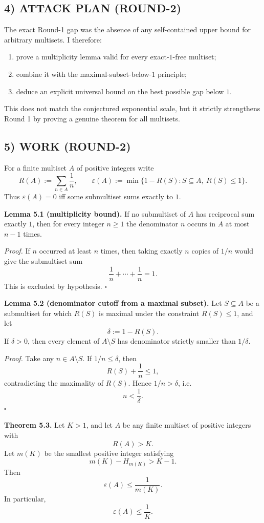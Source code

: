 \subsection*{4) ATTACK PLAN (ROUND-2)}
The exact Round-1 gap was the absence of any self-contained upper bound for arbitrary multisets. I therefore:

\begin{enumerate}
\item prove a multiplicity lemma valid for every exact-$1$-free multiset;
\item combine it with the maximal-subset-below-$1$ principle;
\item deduce an explicit universal bound on the best possible gap below $1$.
\end{enumerate}

This does not match the conjectured exponential scale, but it strictly strengthens Round 1 by proving a genuine theorem for all multisets.

\subsection*{5) WORK (ROUND-2)}
For a finite multiset $A$ of positive integers write
\[
R(A):=\sum_{n\in A}\frac1n,
\qquad
\varepsilon(A):=
\min\{1-R(S): S\subseteq A,\ R(S)\le 1\}.
\]
Thus $\varepsilon(A)=0$ iff some submultiset sums exactly to $1$.

\medskip
\textbf{Lemma 5.1 (multiplicity bound).}
If no submultiset of $A$ has reciprocal sum exactly $1$, then for every integer $n\ge 1$ the denominator $n$ occurs in $A$ at most $n-1$ times.

\emph{Proof.}
If $n$ occurred at least $n$ times, then taking exactly $n$ copies of $1/n$ would give the submultiset sum
\[
\frac1n+\cdots+\frac1n=1.
\]
This is excluded by hypothesis. \hfill $\square$

\medskip
\textbf{Lemma 5.2 (denominator cutoff from a maximal subset).}
Let $S\subseteq A$ be a submultiset for which $R(S)$ is maximal under the constraint $R(S)\le 1$, and let
\[
\delta:=1-R(S).
\]
If $\delta>0$, then every element of $A\setminus S$ has denominator strictly smaller than $1/\delta$.

\emph{Proof.}
Take any $n\in A\setminus S$. If $1/n\le \delta$, then
\[
R(S)+\frac1n\le 1,
\]
contradicting the maximality of $R(S)$. Hence $1/n>\delta$, i.e.
\[
n<\frac1\delta.
\]
\hfill $\square$

\medskip
\textbf{Theorem 5.3.}
Let $K>1$, and let $A$ be any finite multiset of positive integers with
\[
R(A)>K.
\]
Let $m(K)$ be the smallest positive integer satisfying
\[
m(K)-H_{m(K)} > K-1.
\]
Then
\[
\varepsilon(A)\le \frac{1}{m(K)}.
\]
In particular,
\[
\varepsilon(A)\le \frac1K.
\]

